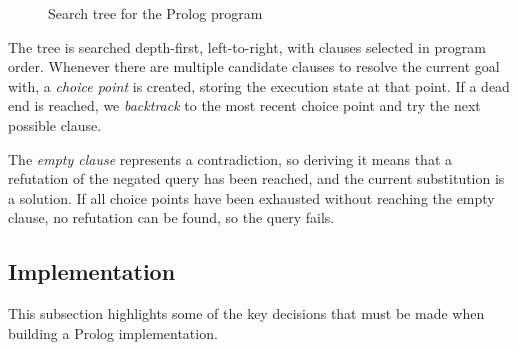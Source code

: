 \begin{figure}[H]
\begin{center}
\end{center}
\caption{Search tree for the Prolog program}
\label{fig:prolog-search-tree}
\end{figure}

The tree is searched depth-first, left-to-right, with clauses selected in program order. Whenever there are multiple candidate clauses to resolve the current goal with, a \emph{choice point} is created, storing the execution state at that point. If a dead end is reached, we \emph{backtrack} to the most recent choice point and try the next possible clause.

The \emph{empty clause} represents a contradiction, so deriving it means that a refutation of the negated query has been reached, and the current substitution is a solution. If all choice points have been exhausted without reaching the empty clause, no refutation can be found, so the query fails.

\subsection{Implementation}

\label{sec:preparation-implementation}

This subsection highlights some of the key decisions that must be made when building a Prolog implementation.

